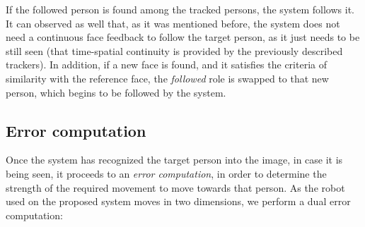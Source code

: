 If the followed person is found among the tracked persons, the system follows it. It can observed as well that, as it was mentioned before, the system does not need a continuous face feedback to follow the target person, as it just needs to be still seen (that time-spatial continuity is provided by the previously described trackers). In addition, if a new face is found, and it satisfies the criteria of similarity with the reference face, the \emph{followed} role is swapped to that new person, which begins to be followed by the system.\\


\subsection{Error computation}

Once the system has recognized the target person into the image, in case it is being seen, it proceeds to an \emph{error computation}, in order to determine the strength of the required movement to move towards that person. As the robot used on the proposed system moves in two dimensions, we perform a dual error computation:

